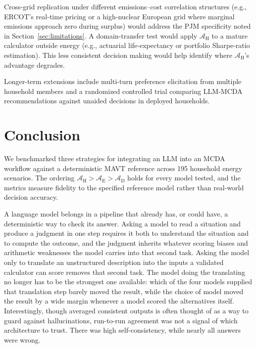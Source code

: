 \documentclass[final,3p,times]{elsarticle}
\begin{document}
Cross-grid replication under different emissions--cost correlation structures (e.g., ERCOT's real-time pricing or a high-nuclear European grid where marginal emissions approach zero during surplus) would address the PJM specificity noted in Section~\ref{sec:limitations}. A domain-transfer test would apply $\mathcal{A}_{\text{H}}$ to a mature calculator outside energy (e.g., actuarial life-expectancy or portfolio Sharpe-ratio estimation). This less consistent decision making would help identify where $\mathcal{A}_{\text{H}}$'s advantage degrades. 

Longer-term extensions include multi-turn preference elicitation from multiple household members and a randomized controlled trial comparing LLM-MCDA recommendations against unaided decisions in deployed households.

\FloatBarrier
\section{Conclusion}
\label{sec:conclusion}
We benchmarked three strategies for integrating an LLM into an MCDA workflow against a deterministic MAVT reference across 195 household energy scenarios. The ordering $\mathcal{A}_{\text{H}} > \mathcal{A}_{\text{E}} > \mathcal{A}_{\text{D}}$ holds for every model tested, and the metrics measure fidelity to the specified reference model rather than real-world decision accuracy.

A language model belongs in a pipeline that already has, or could have, a deterministic way to check its answer. Asking a model to read a situation and produce a judgment in one step requires it both to understand the situation and to compute the outcome, and the judgment inherits whatever scoring biases and arithmetic weaknesses the model carries into that second task. Asking the model only to translate an unstructured description into the inputs a validated calculator can score removes that second task. The model doing the translating no longer has to be the strongest one available: which of the four models supplied that translation step barely moved the result, while the choice of model moved the result by a wide margin whenever a model scored the alternatives itself. Interestingly, though averaged consistent outputs is often thought of as a way to guard against hallucinations, run-to-run agreement was not a signal of which architecture to trust. There was high self-consistency, while nearly all answers were wrong.
\end{document}
